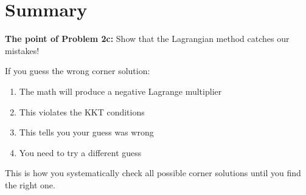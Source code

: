 \documentclass[11pt]{article}
\begin{document}
\section{Summary}

\begin{tcolorbox}[colback=blue!5!white,colframe=blue!75!black,title=Key Takeaway]
\textbf{The point of Problem 2c:} Show that the Lagrangian method catches our mistakes!

If you guess the wrong corner solution:
\begin{enumerate}
\item The math will produce a negative Lagrange multiplier
\item This violates the KKT conditions
\item This tells you your guess was wrong
\item You need to try a different guess
\end{enumerate}

This is how you systematically check all possible corner solutions until you find the right one.
\end{tcolorbox}
\end{document}
